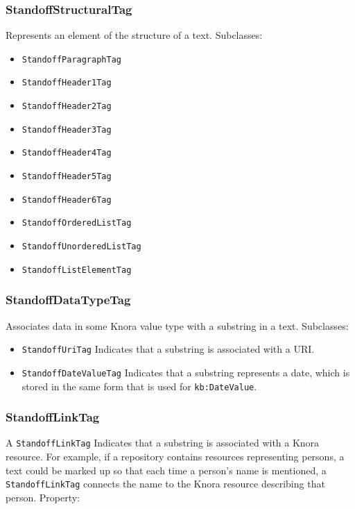 \documentclass[12pt, a4paper]{article}
\begin{document}
\subsubsection{StandoffStructuralTag}

Represents an element of the structure of a text. Subclasses:

\begin{itemize}
	\item \texttt{StandoffParagraphTag}
	\item \texttt{StandoffHeader1Tag}
	\item \texttt{StandoffHeader2Tag}
	\item \texttt{StandoffHeader3Tag}
	\item \texttt{StandoffHeader4Tag}
	\item \texttt{StandoffHeader5Tag}
	\item \texttt{StandoffHeader6Tag}
	\item \texttt{StandoffOrderedListTag}
	\item \texttt{StandoffUnorderedListTag}
	\item \texttt{StandoffListElementTag}
\end{itemize}

\subsubsection{StandoffDataTypeTag}

Associates data in some Knora value type with a substring in a text. Subclasses:

\begin{itemize}
	\item \texttt{StandoffUriTag} Indicates that a substring is associated with a URI.
	\item \texttt{StandoffDateValueTag} Indicates that a substring represents a date, which is stored in the same form that is used for \texttt{kb:DateValue}.
\end{itemize}

\subsubsection{StandoffLinkTag}

\label{subsubsec:standoff-link}

A \texttt{StandoffLinkTag} Indicates that a substring is associated with a Knora resource. For example, if a repository contains resources representing persons, a text could be marked up so that each time a person's name is mentioned, a \texttt{StandoffLinkTag} connects the name to the Knora resource describing that person. Property:
\end{document}

